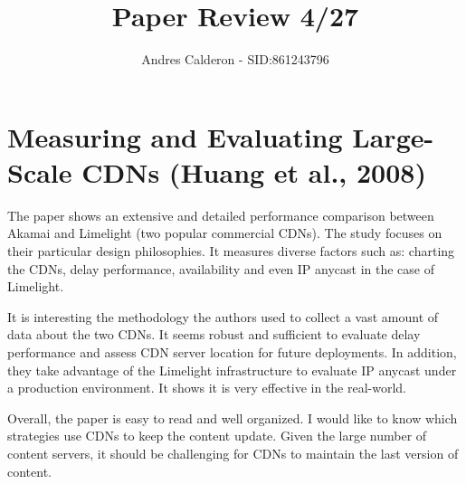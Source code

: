 \documentclass[a4paper,10pt]{scrartcl}
\title{Paper Review 4/27}
\author{Andres Calderon - SID:861243796}
\begin{document}
\maketitle
\thispagestyle{empty}

\section*{Measuring and Evaluating Large-Scale CDNs (Huang et al., 2008)}
The paper shows an extensive and detailed performance comparison between Akamai and Limelight (two popular commercial CDNs). The study focuses on their particular design philosophies.  It measures diverse factors such as: charting the CDNs, delay performance, availability and even IP anycast in the case of Limelight.

It is interesting the methodology the authors used to collect a vast amount of data about the two CDNs.  It seems robust and sufficient to evaluate delay performance and assess CDN server location for future deployments.  In addition, they take advantage of the Limelight infrastructure to evaluate IP anycast under a production environment.  It shows it is very effective in the real-world.  

Overall, the paper is easy to read and well organized.  I would like to know which strategies use CDNs to keep the content update.  Given the large number of content servers, it should be challenging for CDNs to maintain the last version of content.

\end{document}
